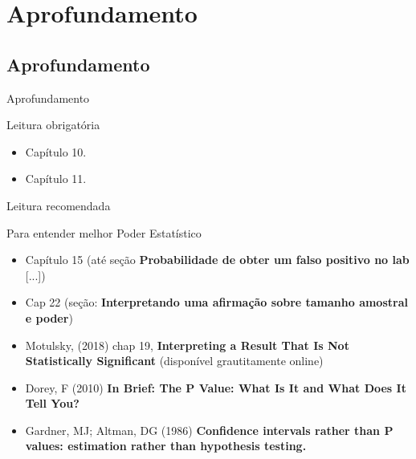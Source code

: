 \documentclass{beamer}
\begin{document}

\section{Aprofundamento}

\subsection{Aprofundamento}

\begin{frame}{\scriptsize Aprofundamento}
  \begin{block}{Leitura obrigatória}
    \footnotesize
    \begin{itemize}
      \footnotesize
    \item Capítulo 10.
    \item Capítulo 11.
    \end{itemize}
  \end{block}
  \begin{block}{Leitura recomendada}
    \scriptsize
    \begin{block}{\scriptsize Para entender melhor Poder Estatístico}
      \begin{itemize}
        \scriptsize
      \item Capítulo 15 ({\tiny até seção {\bf Probabilidade de obter um falso positivo no lab} [...]})
      \end{itemize}
    \end{block}
    \begin{itemize}
      \tiny
    \item Cap 22 (seção: {\bf Interpretando uma afirmação sobre tamanho amostral e poder})
    \item Motulsky, (2018) chap 19, {\bf Interpreting a Result That Is Not Statistically Significant} (disponível grautitamente online)
    \item Dorey, F (2010) {\bf In Brief: The P Value: What Is It and What Does It Tell You?}
    \item Gardner, MJ; Altman, DG (1986) {\bf Confidence intervals rather than P values: estimation rather than hypothesis testing.}
    \end{itemize}
  \end{block}
\end{frame}
\end{document}
